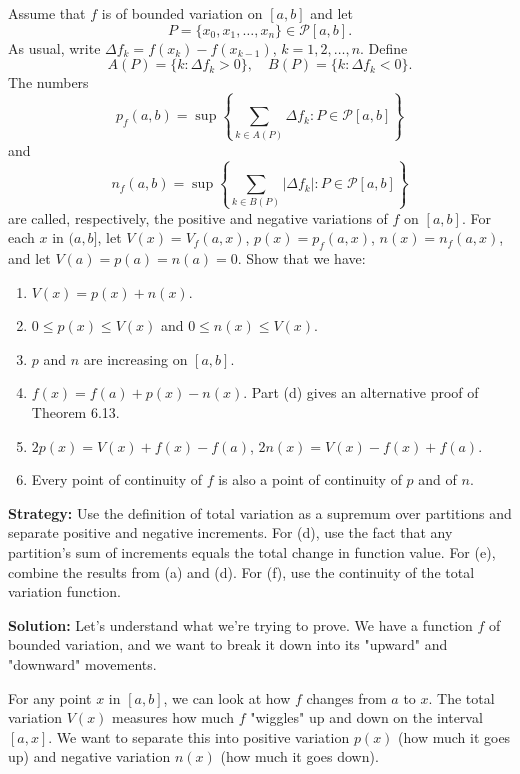 \begin{problembox}
\begin{problemstatement}
Assume that $f$ is of bounded variation on $[a, b]$ and let
\[P = \{x_0, x_1, \ldots, x_n\} \in \mathcal{P}[a, b].\]
As usual, write $\Delta f_k = f(x_k) - f(x_{k-1})$, $k = 1, 2, \ldots, n$. Define
\[A(P) = \{k : \Delta f_k > 0\}, \quad B(P) = \{k : \Delta f_k < 0\}.\]
The numbers
\[p_f(a, b) = \sup \left\{ \sum_{k \in A(P)} \Delta f_k : P \in \mathcal{P}[a, b] \right\}\]
and
\[n_f(a, b) = \sup \left\{ \sum_{k \in B(P)} |\Delta f_k| : P \in \mathcal{P}[a, b] \right\}\]
are called, respectively, the positive and negative variations of $f$ on $[a, b]$. For each $x$ in $(a, b]$, let $V(x) = V_f(a, x)$, $p(x) = p_f(a, x)$, $n(x) = n_f(a, x)$, and let $V(a) = p(a) = n(a) = 0$. Show that we have:
\begin{enumerate}[label=\alph*)]
\item $V(x) = p(x) + n(x)$.
\item $0 \leq p(x) \leq V(x)$ and $0 \leq n(x) \leq V(x)$.
\item $p$ and $n$ are increasing on $[a, b]$.
\item $f(x) = f(a) + p(x) - n(x)$. Part (d) gives an alternative proof of Theorem 6.13.
\item $2p(x) = V(x) + f(x) - f(a)$, $2n(x) = V(x) - f(x) + f(a)$.
\item Every point of continuity of $f$ is also a point of continuity of $p$ and of $n$.
\end{enumerate}
\end{problemstatement}
\end{problembox}

\noindent\textbf{Strategy:} Use the definition of total variation as a supremum over partitions and separate positive and negative increments. For (d), use the fact that any partition's sum of increments equals the total change in function value. For (e), combine the results from (a) and (d). For (f), use the continuity of the total variation function.

\bigskip\noindent\textbf{Solution:}
Let's understand what we're trying to prove. We have a function $f$ of bounded variation, and we want to break it down into its "upward" and "downward" movements.

For any point $x$ in $[a,b]$, we can look at how $f$ changes from $a$ to $x$. The total variation $V(x)$ measures how much $f$ "wiggles" up and down on the interval $[a,x]$. We want to separate this into positive variation $p(x)$ (how much it goes up) and negative variation $n(x)$ (how much it goes down).

